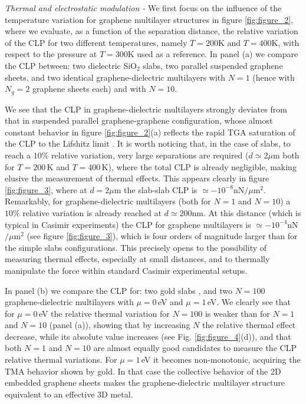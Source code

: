 \documentclass[aps,pra,superscriptaddress,amsmath,amssymb,showpacs,twocolumn,notitlepage]{revtex4-1}
\begin{document}
\emph{Thermal and electrostatic modulation -} 
{We first focus on the influence of the temperature variation for graphene multilayer structures in figure \ref{fig:figure_2}, where we evaluate, as a function of the separation distance, the relative variation of the CLP for two different temperatures, namely $T=200$K and $T=400$K, with respect to the pressure at $T=300$K used as a reference. In panel (a) we compare the CLP between: two dielectric SiO$_2$ slabs, two parallel suspended graphene sheets, and two identical graphene-dielectric multilayers with $N=1$ (hence with $N_g=2$ graphene sheets each) and with $N=10$.}



{We see that the CLP in graphene-dielectric multilayers strongly deviates from that in suspended parallel graphene-graphene configuration, whose almost constant behavior in figure  \ref{fig:figure_2}(a) reflects the rapid TGA saturation of the CLP to the Lifshitz limit \cite{Gomez09}.
It is worth noticing that, in the case of slabs, to reach a $10\%$ relative variation, very large separations are required ($d\simeq2\mu$m both for $T=200\,$K and $T=400\,$K), where the total CLP is already negligible, making elusive the measurement of thermal effects. This appears clearly in figure \ref{fig:figure_3}, where at $d=2\mu$m the slab-slab CLP is $\simeq -10^{-8}$nN$/\mu$m$^2$. Remarkably, for graphene-dielectric multilayers (both for $N=1$ and $N=10$) a $10\%$ relative variation is already reached at $d\simeq200$nm. At this distance (which is typical in Casimir experiments) the CLP for graphene multilayers is $\simeq -10^{-4}$nN$/\mu$m$^2$  (see figure \ref{fig:figure_3}), which is four orders of magnitude larger than for the simple slabs configurations. This precisely opens to the possibility of measuring thermal effects, especially at small distances, and to thermally manipulate the force within standard Casimir experimental setups.  

In panel (b) we compare the CLP for: two gold slabs \cite{DrudeGold}, and two $N=100$ graphene-dielectric multilayers with $\mu=0\,$eV and $\mu=1\,$eV. We clearly see that for $\mu=0\,$eV the relative thermal variation for $N=100$ is weaker than for $N=1$ and $N=10$ (panel (a)), showing that by increasing $N$ the relative thermal effect decrease, while its absolute value increases  (see Fig. \ref{fig:figure_4}(d)), and that both $N=1$ and $N=10$ are almost equally good candidates to measure the CLP relative thermal variations. For $\mu=1\,$eV it becomes non-monotonic, acquiring the TMA behavior shown by gold. In that case the collective behavior of the 2D embedded graphene sheets makes the graphene-dielectric multilayer structure equivalent to an effective 3D metal.}
\end{document}
